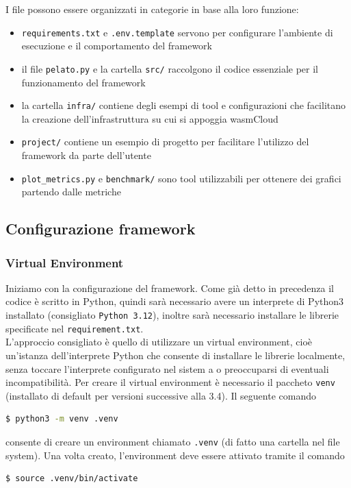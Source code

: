 I file possono essere organizzati in categorie in base alla loro funzione:

\begin{itemize}
    \item \texttt{requirements.txt} e \texttt{.env.template} servono per configurare l'ambiente di esecuzione e il comportamento del framework
    \item il file \texttt{pelato.py} e la cartella \texttt{src/} raccolgono il codice essenziale per il funzionamento del framework
    \item la cartella \texttt{infra/} contiene degli esempi di tool e configurazioni che facilitano la creazione dell'infrastruttura su cui si appoggia wasmCloud
    \item \texttt{project/} contiene un esempio di progetto per facilitare l'utilizzo del framework da parte dell'utente
    \item \texttt{plot\_metrics.py} e \texttt{benchmark/} sono tool utilizzabili per ottenere dei grafici partendo dalle metriche 
\end{itemize}


\subsection{Configurazione framework}

\subsubsection{Virtual Environment}
Iniziamo con la configurazione del framework. Come già detto in precedenza il codice è scritto in Python, quindi sarà necessario avere un interprete di Python3 installato (consigliato \texttt{Python 3.12}), inoltre sarà necessario installare le librerie specificate nel \texttt{requirement.txt}.\\
L'approccio consigliato è quello di utilizzare un virtual environment, cioè un'istanza dell'interprete Python che consente di installare le librerie localmente, senza toccare l'interprete configurato nel sistem a o preoccuparsi di eventuali incompatibilità. Per creare il virtual environment è necessario il paccheto \texttt{venv} (installato di default per versioni successive alla 3.4). Il seguente comando

\begin{lstlisting}[language=bash]
    $ python3 -m venv .venv
\end{lstlisting}
consente di creare un environment chiamato \texttt{.venv} (di fatto una cartella nel file system). Una volta creato, l'environment deve essere attivato tramite il comando 
\begin{lstlisting}[language=bash]
    $ source .venv/bin/activate
\end{lstlisting}

